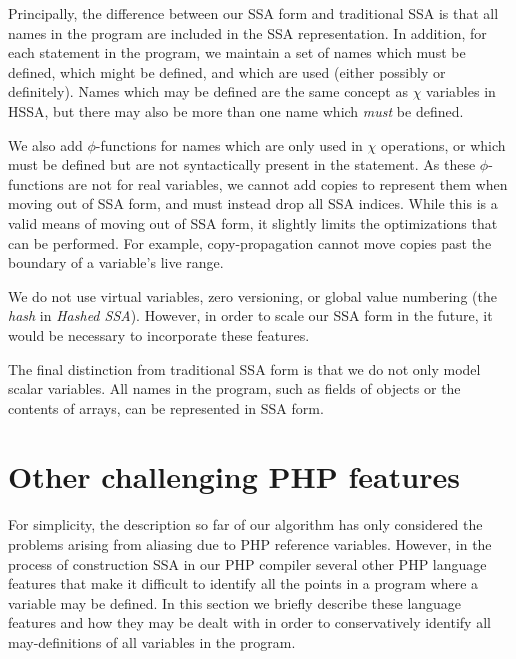 Principally, the difference between our SSA form and traditional SSA is
that all names in the program are included in the SSA representation.
In addition, for each statement in the program, we maintain a set of
names which must be defined, which might be defined, and which are used
(either possibly or definitely).  Names which may be defined are the
same concept as $\chi$ variables in HSSA, but there may also be more
than one name which \emph{must} be defined.

We also add $\phi$-functions for names which are only used in $\chi$
operations, or which must be defined but are not syntactically present
in the statement.  As these $\phi$-functions are not for real variables,
we cannot add copies to represent them when moving out of SSA form, and
must instead drop all SSA indices.  While this is a valid means of
moving out of SSA form, it slightly limits the optimizations that can be
performed.  For example, copy-propagation cannot move copies past the
boundary of a variable's live range.

We do not use virtual variables, zero versioning, or global value
numbering (the \emph{hash} in \emph{Hashed SSA}).  However, in
order to scale our SSA form in the future, it would be necessary to
incorporate these features.

The final distinction from traditional SSA form is that we do not only
model scalar variables.  All names in the program, such as fields of
objects or the contents of arrays, can be represented in SSA form.


\section{Other challenging PHP features}
\label{other-difficult-features}

For simplicity, the description so far of our algorithm has only
considered the problems arising from aliasing due to PHP reference
variables. However, in the process of construction SSA in our PHP
compiler several other PHP language features that make it difficult to
identify all the points in a program where a variable may be
defined. In this section we briefly describe these language features
and how they may be dealt with in order to conservatively identify all
may-definitions of all variables in the program.

